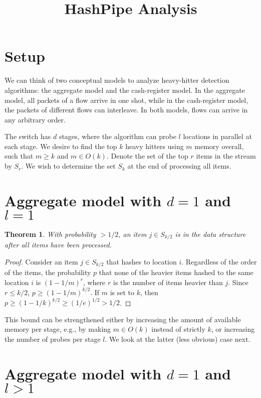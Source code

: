 \documentclass[10pt]{article}
\title{HashPipe Analysis}
\newtheorem{theorem}{Theorem}[section]
\begin{document}
\maketitle

\section{Setup}

We can think of two conceptual models to analyze heavy-hitter detection
algorithms: the aggregate model and the cash-register model. In the aggregate
model, all packets of a flow arrive in one shot, while in the cash-register
model, the packets of different flows can interleave. In both models, flows can
arrive in any arbitrary order.

The switch has $d$ stages, where the algorithm can probe $l$ locations in
parallel at each stage. We desire to find the top $k$ heavy hitters using $m$
memory overall, such that $m \geq k$ and $m \in O(k)$. Denote the set of the top
$r$ items in the stream
by $S_r$. We wish to determine the set $S_k$ at the end of processing all items.

\section{Aggregate model with $d=1$ and $l=1$}

\begin{theorem}
  With probability $> 1/2$, an item $j \in S_{k/2}$ is in the data structure
  after all items have been processed.
\end{theorem}
\begin{proof}
  Consider an item $j \in S_{k/2}$ that hashes to location $i$. Regardless of
  the order of the items, the probability $p$ that none of the heavier items
  hashed to the same location $i$ is $(1 - 1/m)^r$, where $r$ is the number of
  items heavier than $j$. Since $r \leq k/2$, $p \geq (1 - 1/m)^{k/2}$. If $m$ is
  set to $k$, then $p \geq (1 - 1/k)^{k/2} \geq (1/e)^{1/2} > 1/2$.
\end{proof}

This bound can be strengthened either by increasing the amount of available
memory per stage, e.g., by making $m \in O(k)$ instead of strictly $k$, or
increasing the number of probes per stage $l$. We look at the latter (less
obvious) case next.

\section{Aggregate model with $d=1$ and $l>1$}
\end{document}
